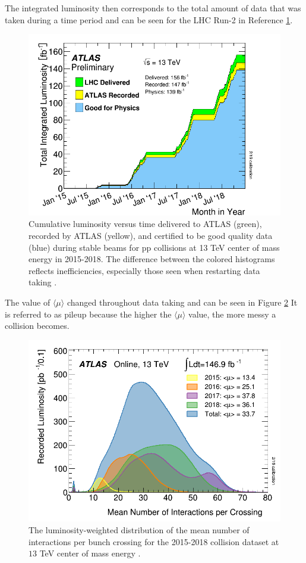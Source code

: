 		The integrated luminosity then corresponds to the total amount of data that was taken during a time period and can be seen for the LHC Run-2 in Reference \ref{fig:lhc-lumi}.
		\begin{figure}[!ht]
		\centering
		\includegraphics[width=.65\textwidth,keepaspectratio=true]{chapters/chapter3_experiment/images/intlumivstimeRun2DQall.png}
		\caption{ Cumulative luminosity versus time delivered to \gls{ATLAS} (green), recorded by \gls{ATLAS} (yellow), and certified to be good quality data (blue) during stable beams for pp collisions at 13 TeV center of mass energy in 2015-2018. The difference between the colored histograms reflects inefficiencies, especially those seen when restarting data taking \cite{luminositypublicresultsrun2}.}
		\label{fig:lhc-lumi}
		\end{figure}
		The value of $\langle \mu \rangle$ changed throughout data taking and can be seen in Figure \ref{fig:run2-mu} It is referred to as pileup because the higher the $\langle \mu \rangle$ value, the more messy a collision becomes.
		\begin{figure}[!ht]
		\centering
		\includegraphics[width=.65\textwidth,keepaspectratio=true]{chapters/chapter3_experiment/images/mu_2015_2018.png}
		\caption{ The luminosity-weighted distribution of the mean number of interactions per bunch crossing for the 2015-2018 \pp collision dataset at $13$ TeV center of mass energy \cite{luminositypublicresultsrun2}.}
		\label{fig:run2-mu}
		\end{figure}
